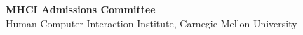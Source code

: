 \documentclass[11pt]{article} %
\begin{document}
 \textbf{MHCI Admissions Committee}\\
Human-Computer Interaction Institute, Carnegie Mellon University
\medskip



\vfill %





\end{document}
